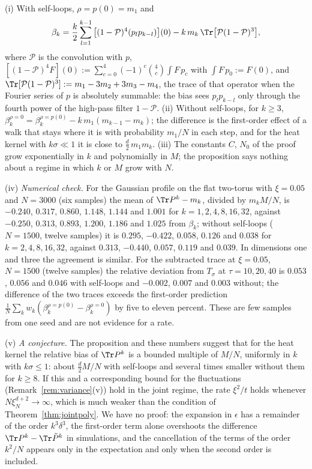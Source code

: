 \begin{remark}\label{rem:bias}
(i) With self-loops, $\rho=p(0)=m_1$ and
\[
\beta_k=\frac k2\sum_{l=1}^{k-1}\big[(1-\mathcal P)^4(p_lp_{k-l})\big](0)-k\,m_k\,\Tr\big[\mathcal P(1-\mathcal P)^3\big],
\]
where $\mathcal P$ is the convolution with $p$, $[(1-\mathcal P)^4F](0):=\sum_{c=0}^4(-1)^c\binom4c\int F\,p_c$ with $\int F\,p_0:=F(0)$, and $\Tr[\mathcal P(1-\mathcal P)^3]:=m_1-3m_2+3m_3-m_4$, the trace of that operator when the Fourier series of $p$ is absolutely summable: the bias sees $p_lp_{k-l}$ only through the fourth power of the high-pass filter $1-\mathcal P$. (ii) Without self-loops, for $k\ge3$, $\beta_k^{\rho=0}=\beta_k^{\rho=p(0)}-k\,m_1(m_{k-1}-m_k)$; the difference is the first-order effect of a walk that stays where it is with probability $m_1/N$ in each step, and for the heat kernel with $k\sigma\ll1$ it is close to $\tfrac d2\,m_1m_k$. (iii) The constants $C$, $N_0$ of the proof grow exponentially in $k$ and polynomially in $M$; the proposition says nothing about a regime in which $k$ or $M$ grow with $N$.

(iv) \emph{Numerical check.} For the Gaussian profile on the flat two-torus with $\xi=0.05$ and $N=3000$ (six samples) the mean of $\Tr P^k-m_k$, divided by $m_kM/N$, is $-0.240$, $0.317$, $0.860$, $1.148$, $1.144$ and $1.001$ for $k=1,2,4,8,16,32$, against $-0.250$, $0.313$, $0.893$, $1.200$, $1.186$ and $1.025$ from $\beta_k$; without self-loops ($N=1500$, twelve samples) it is $0.295$, $-0.422$, $0.058$, $0.126$ and $0.038$ for $k=2,4,8,16,32$, against $0.313$, $-0.440$, $0.057$, $0.119$ and $0.039$. In dimensions one and three the agreement is similar. For the subtracted trace at $\xi=0.05$, $N=1500$ (twelve samples) the relative deviation from $T_\sigma$ at $\tau=10,20,40$ is $0.053$, $0.056$ and $0.046$ with self-loops and $-0.002$, $0.007$ and $0.003$ without; the difference of the two traces exceeds the first-order prediction $\frac1N\sum_kw_k(\beta_k^{\rho=p(0)}-\beta_k^{\rho=0})$ by five to eleven percent. These are few samples from one seed and are not evidence for a rate.

(v) \emph{A conjecture.} The proposition and these numbers suggest that for the heat kernel the relative bias of $\Tr P^k$ is a bounded multiple of $M/N$, uniformly in $k$ with $k\sigma\le1$: about $\tfrac d2M/N$ with self-loops and several times smaller without them for $k\ge8$. If this and a corresponding bound for the fluctuations (Remark~\ref{rem:variance}(v)) hold in the joint regime, the rate $\xi^2/t$ holds whenever $N\xi_N^{d+2}\to\infty$, which is much weaker than the condition of Theorem~\ref{thm:jointpoly}. We have no proof: the expansion in $\epsilon$ has a remainder of the order $k^3\delta^3$, the first-order term alone overshoots the difference $\Tr P^k-\Tr\tilde P^k$ in simulations, and the cancellation of the terms of the order $k^2/N$ appears only in the expectation and only when the second order is included.
\end{remark}

